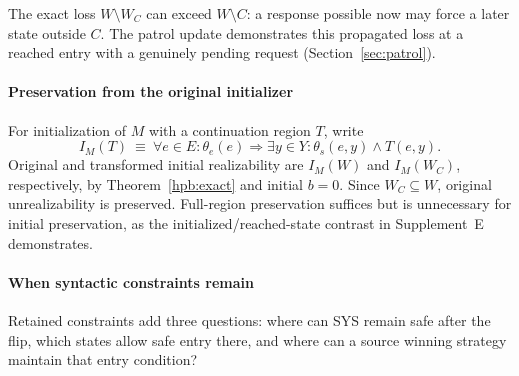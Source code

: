 The exact loss $W\setminus W_C$ can exceed $W\setminus C$:
a response possible now may force a later state outside $C$.
The patrol update demonstrates this propagated loss at a reached
entry with a genuinely pending request (Section~\ref{sec:patrol}).

\paragraph{Preservation from the original initializer}
For initialization of $M$ with a continuation region $T$, write
\begin{equation}
 I_M(T)\ \equiv\ \forall e\in E:\theta_e(e)\Rightarrow
 \exists y\in Y:\theta_s(e,y)\land T(e,y).
 \label{hpb:initial}
\end{equation}
Original and transformed initial realizability are $I_M(W)$ and
$I_M(W_C)$, respectively, by Theorem~\ref{hpb:exact} and initial $b=0$.
Since $W_C\subseteq W$, original unrealizability is preserved.
Full-region preservation suffices but is unnecessary for initial
preservation, as the initialized/reached-state contrast in Supplement~E
demonstrates.

\paragraph{When syntactic constraints remain}
Retained constraints add three questions: where can SYS remain safe
after the flip, which states allow safe entry there, and where can a
source winning strategy maintain that entry condition?

